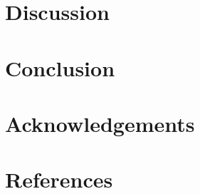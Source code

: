 \documentclass[
]{article}
\begin{document}
\hypertarget{discussion}{%
\section{Discussion}\label{discussion}}

\hypertarget{conclusion}{%
\section{Conclusion}\label{conclusion}}

\hypertarget{acknowledgements}{%
\section{Acknowledgements}\label{acknowledgements}}

\newpage

\hypertarget{references}{%
\section{References}\label{references}}
\end{document}

